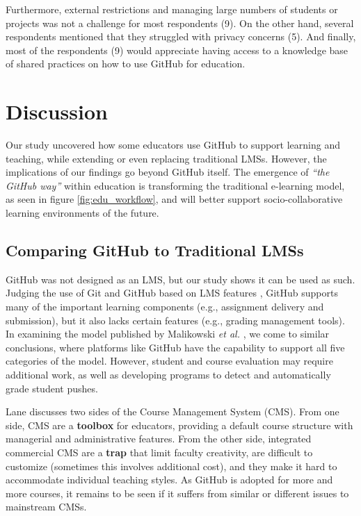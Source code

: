 Furthermore, external restrictions and managing large numbers of students or projects was not a challenge for most respondents (9). On the other hand, several respondents mentioned that they struggled with privacy concerns (5). And finally, most of the respondents (9) would appreciate having access to a knowledge base of shared practices on how to use GitHub for education. 

\section{Discussion}
Our study uncovered how some educators use GitHub to support learning and teaching, while extending or even replacing traditional LMSs. However, the implications of our findings go beyond GitHub itself. The emergence of \textit{``the GitHub way''} within education is transforming the traditional e-learning model, as seen in figure \ref{fig:edu_workflow}, and will better support socio-collaborative learning environments \cite{kreijns2002sociability} of the future.

\subsection{Comparing GitHub to Traditional LMSs}
GitHub was not designed as an LMS, but our study shows it can be used as such. Judging the use of Git and GitHub based on LMS features \cite{kumar2011comparative}, GitHub supports many of the important learning components (e.g., assignment delivery and submission), but it also lacks certain features (e.g., grading management tools). In examining the model published by Malikowski \textit{et al.} \cite{malikowski2007model}, we come to similar conclusions, where platforms like GitHub have the capability to support all five categories of the model. However, student and course evaluation may require additional work, as well as developing programs to detect and automatically grade student pushes.

Lane \cite{lane2008toolbox} discusses two sides of the Course Management System (CMS). From one side, CMS are a \textbf{toolbox} for educators, providing a default course structure with managerial and administrative features. From the other side, integrated commercial CMS are a \textbf{trap} that limit faculty creativity, are difficult to customize (sometimes this involves additional cost), and they make it hard to accommodate individual teaching styles. As GitHub is adopted for more and more courses, it remains to be seen if it suffers from similar or different issues to mainstream CMSs.

